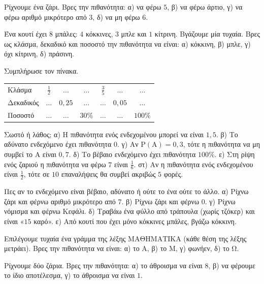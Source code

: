 

\ex Ρίχνουμε ένα ζάρι. Βρες την πιθανότητα: α) να φέρω $5$, β) να φέρω άρτιο, γ) να φέρω αριθμό μικρότερο από $3$, δ) να μη φέρω $6$.

\ex Ένα κουτί έχει $8$ μπάλες: $4$ κόκκινες, $3$ μπλε και $1$ κίτρινη. Βγάζουμε μία τυχαία. Βρες ως κλάσμα, δεκαδικό και ποσοστό την πιθανότητα να είναι: α) κόκκινη, β) μπλε, γ) όχι κίτρινη, δ) πράσινη.

\ex Συμπλήρωσε τον πίνακα. \par
\begin{center}
\renewcommand{\arraystretch}{1.25}
\begin{tabular}{lcccccc}
\toprule
Κλάσμα & $\frac{1}{2}$ & $\ldots$ & $\ldots$ & $\frac{3}{5}$ & $\ldots$ & $\ldots$\\
Δεκαδικός & $\ldots$ & $0{,}25$ & $\ldots$ & $\ldots$ & $0{,}05$ & $\ldots$\\
Ποσοστό & $\ldots$ & $\ldots$ & $30\%$ & $\ldots$ & $\ldots$ & $100\%$\\
\bottomrule
\end{tabular}
\end{center}

\ex Σωστό ή λάθος; α) Η πιθανότητα ενός ενδεχομένου μπορεί να είναι $1{,}5$. β) Το αδύνατο ενδεχόμενο έχει πιθανότητα $0$. γ) Αν $\mathrm{Ρ}(\mathrm{Α})=0{,}3$, τότε η πιθανότητα να μη συμβεί το $\mathrm{Α}$ είναι $0{,}7$. δ) Το βέβαιο ενδεχόμενο έχει πιθανότητα $100\%$. ε) Στη ρίψη ενός ζαριού η πιθανότητα να φέρω $7$ είναι $\frac{1}{6}$. στ) Αν η πιθανότητα ενός ενδεχομένου είναι $\frac{1}{2}$, τότε σε $10$ επαναλήψεις θα συμβεί ακριβώς $5$ φορές.

\ex Πες αν το ενδεχόμενο είναι βέβαιο, αδύνατο ή ούτε το ένα ούτε το άλλο. α) Ρίχνω ζάρι και φέρνω αριθμό μικρότερο από $7$. β) Ρίχνω ζάρι και φέρνω $0$. γ) Ρίχνω νόμισμα και φέρνω Κεφάλι. δ) Τραβάω ένα φύλλο από τράπουλα (χωρίς τζόκερ) και είναι «$15$ καρό». ε) Από κουτί που έχει μόνο κόκκινες μπάλες, βγάζω κόκκινη.

\ex Επιλέγουμε τυχαία ένα γράμμα της λέξης ΜΑΘΗΜΑΤΙΚΑ (κάθε θέση της λέξης μετράει). Βρες την πιθανότητα να είναι: α) το Α, β) το Μ, γ) φωνήεν, δ) το Ω.

\ex Ρίχνουμε δύο ζάρια. Βρες την πιθανότητα: α) το άθροισμα να είναι $8$, β) να φέρουμε το ίδιο αποτέλεσμα, γ) το άθροισμα να είναι $1$.


